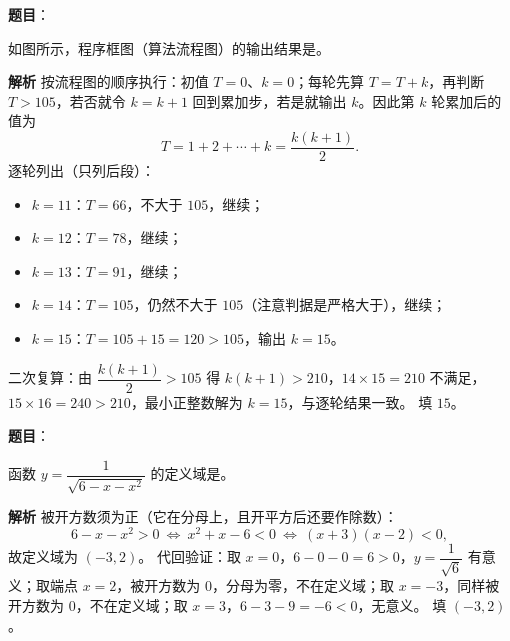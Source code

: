\begin{answer}

\textbf{题目}：

如图所示，程序框图（算法流程图）的输出结果是\gkblank{}。
\nopagebreak[4]
\begin{center}\end{center}
\nopagebreak[4]
\textbf{解析}
按流程图的顺序执行：初值 $T=0$、$k=0$；每轮先算 $T=T+k$，再判断 $T>105$，若否就令 $k=k+1$ 回到累加步，若是就输出 $k$。因此第 $k$ 轮累加后的值为
\nopagebreak[4]
\[
T=1+2+\cdots+k=\frac{k(k+1)}{2}.
\]
逐轮列出（只列后段）：
\begin{itemize}
\item $k=11$：$T=66$，不大于 $105$，继续；
\item $k=12$：$T=78$，继续；
\item $k=13$：$T=91$，继续；
\item $k=14$：$T=105$，仍然不大于 $105$（注意判据是严格大于），继续；
\item $k=15$：$T=105+15=120>105$，输出 $k=15$。
\end{itemize}
二次复算：由 $\dfrac{k(k+1)}{2}>105$ 得 $k(k+1)>210$，$14\times15=210$ 不满足，$15\times16=240>210$，最小正整数解为 $k=15$，与逐轮结果一致。
填 $15$。


\end{answer}
\begin{answer}

\textbf{题目}：

函数 $y=\dfrac{1}{\sqrt{6-x-x^2}}$ 的定义域是\gkblank{}。

\textbf{解析}
被开方数须为正（它在分母上，且开平方后还要作除数）：
\nopagebreak[4]
\[
6-x-x^2>0\ \Longleftrightarrow\ x^2+x-6<0\ \Longleftrightarrow\ (x+3)(x-2)<0,
\]
故定义域为 $(-3,2)$。
代回验证：取 $x=0$，$6-0-0=6>0$，$y=\dfrac{1}{\sqrt6}$ 有意义；取端点 $x=2$，被开方数为 $0$，分母为零，不在定义域；取 $x=-3$，同样被开方数为 $0$，不在定义域；取 $x=3$，$6-3-9=-6<0$，无意义。
填 $(-3,2)$。


\end{answer}
